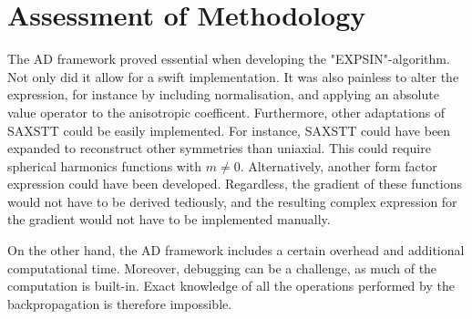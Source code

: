 \section{Assessment of Methodology}
\noindent
The AD framework proved essential when developing the "EXPSIN"-algorithm. Not only did it allow for a swift implementation.
It was also painless to alter the expression, for instance by including normalisation, and applying an absolute value operator to the anisotropic coefficent.
Furthermore, other adaptations of SAXSTT could be easily implemented. For instance, SAXSTT could have been expanded to reconstruct other symmetries than uniaxial.
This could require spherical harmonics functions with $m \neq 0$. Alternatively, another form factor expression could have been developed.
Regardless, the gradient of these functions would not have to be derived tediously, and the resulting complex expression for the gradient would not have to be implemented manually.

On the other hand, the AD framework includes a certain overhead and additional computational time. Moreover, debugging can be a challenge, as much of the computation is built-in.
Exact knowledge of all the operations performed by the backpropagation is therefore impossible.


